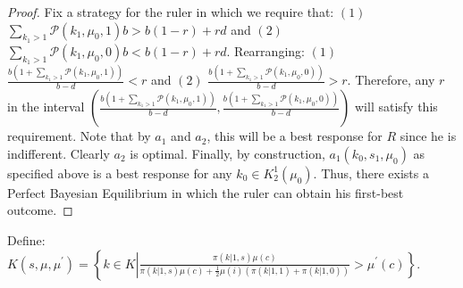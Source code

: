 \documentclass[11pt,]{article}
\begin{document}
\begin{proof}
Fix a strategy for the ruler in which we require that: $(1)$ $\sum_{k_1>1}\mathcal{P}(k_1,\mu_0,1)b>b(1-r)+rd$ and $(2)$ $\sum_{k_1>1}\mathcal{P}(k_1,\mu_0,0)b<b(1-r)+rd$.  Rearranging: $(1)$ $\frac{b\left(1+\sum_{k_1>1}\mathcal{P}(k_1,\mu_0,1)\right)}{b-d}<r$ and $(2)$ $\frac{b\left(1+\sum_{k_1>1}\mathcal{P}(k_1,\mu_0,0)\right)}{b-d}>r$.  Therefore, any $r$ in the interval $\left(\frac{b\left(1+\sum_{k_1>1}\mathcal{P}(k_1,\mu_0,1)\right)}{b-d},\frac{b\left(1+\sum_{k_1>1}\mathcal{P}(k_1,\mu_0,0)\right)}{b-d}\right)$ will satisfy this requirement.  Note that by $a_1$ and $a_2$, this will be a best response for $R$ since he is indifferent.  Clearly $a_2$ is optimal.  %
Finally, by construction, $a_1(k_0,s_1,\mu_0)$ as specified above is a best response for any $k_0\in K_2^1(\mu_0)$.  Thus, there exists a Perfect Bayesian Equilibrium in which the ruler can obtain his first-best outcome.
\end{proof}






\noindent Define: $K(s,\mu,\mu^{\prime})=\left\{k\in K\left|\frac{\pi(k|1,s)\mu(c)}{\pi(k|1,s)\mu(c)+\frac{1}{2}\mu(i)(\pi(k|1,1)+\pi(k|1,0))}>\mu^{\prime}(c)\right.\right\}$.
\end{document}
